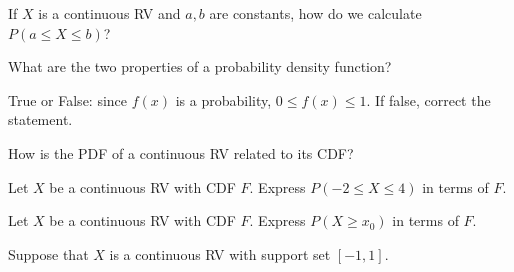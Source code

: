 \documentclass[addpoints,12pt]{exam}
\begin{document}
\begin{questions}
%

\question If $X$ is a continuous RV and $a,b$ are constants, how do we calculate $P(a \leq X \leq b)$?

\question What are the two properties of a probability density function? 

\question True or False: since $f(x)$ is a probability, $0\leq f(x) \leq 1$. If false, correct the statement.

\question How is the PDF of a continuous RV related to its CDF?

\question Let $X$ be a continuous RV with CDF $F$. Express $P(-2 \leq X \leq 4)$ in terms of $F$.

\question Let $X$ be a continuous RV with CDF $F$. Express $P(X \geq x_0)$ in terms of $F$.

\question Suppose that $X$ is a continuous RV with support set $[-1,1]$.
\end{questions}
\end{document}
